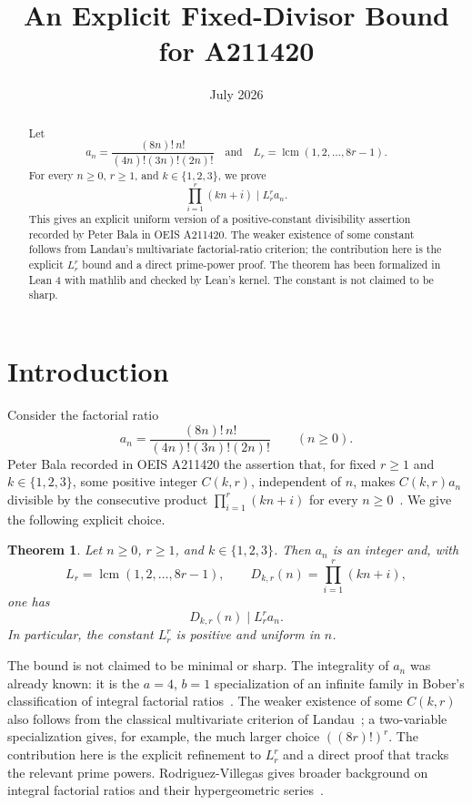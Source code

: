 \documentclass[11pt,a4paper]{amsart}
\title{An Explicit Fixed-Divisor Bound for A211420}
\date{July 2026}
\newtheorem{theorem}{Theorem}
\begin{document}
\begin{abstract}
Let
\[
a_n=\frac{(8n)!\,n!}{(4n)!(3n)!(2n)!}
\quad\text{and}\quad
L_r=\operatorname{lcm}(1,2,\ldots,8r-1).
\]
For every $n\geq0$, $r\geq1$, and $k\in\{1,2,3\}$, we prove
\[
\prod_{i=1}^{r}(kn+i)\mid L_r^r a_n.
\]
This gives an explicit uniform version of a positive-constant divisibility
assertion recorded by Peter Bala in OEIS A211420. The weaker existence of some
constant follows from Landau's multivariate factorial-ratio criterion; the
contribution here is the explicit $L_r^r$ bound and a direct prime-power proof.
The theorem has been formalized in Lean 4 with mathlib and checked by Lean's
kernel. The constant is not claimed to be sharp.
\end{abstract}

\maketitle

\section{Introduction}

Consider the factorial ratio
\[
 a_n=\frac{(8n)!\,n!}{(4n)!(3n)!(2n)!}
 \qquad(n\geq0).
\]
Peter Bala recorded in OEIS A211420 the assertion that, for fixed $r\geq1$
and $k\in\{1,2,3\}$, some positive integer $C(k,r)$, independent of $n$,
makes $C(k,r)a_n$ divisible by the consecutive product
$\prod_{i=1}^r(kn+i)$ for every $n\geq0$~\cite{OEIS}. We give the following
explicit choice.

\begin{theorem}\label{thm:main}
Let $n\geq0$, $r\geq1$, and $k\in\{1,2,3\}$. Then $a_n$ is an integer and,
with
\[
 L_r=\operatorname{lcm}(1,2,\ldots,8r-1),
 \qquad D_{k,r}(n)=\prod_{i=1}^{r}(kn+i),
\]
one has
\[
 D_{k,r}(n)\mid L_r^r a_n.
\]
In particular, the constant $L_r^r$ is positive and uniform in $n$.
\end{theorem}

The bound is not claimed to be minimal or sharp. The integrality of $a_n$ was
already known: it is the $a=4$, $b=1$ specialization of an infinite family in
Bober's classification of integral factorial ratios~\cite{Bober2009}. The
weaker existence of some $C(k,r)$ also follows from the classical multivariate
criterion of Landau~\cite{Landau1900}; a two-variable specialization gives,
for example, the much larger choice $((8r)!)^r$. The contribution here is the
explicit refinement to $L_r^r$ and a direct proof that tracks the relevant
prime powers. Rodriguez-Villegas gives broader background on integral
factorial ratios and their hypergeometric series~\cite{RV2007}.
\end{document}
